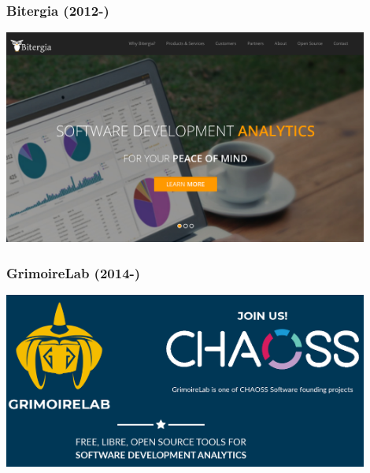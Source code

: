 \begin{frame}[fragile]
  \frametitle{Bitergia (2012-)}

  \begin{center}
  \includegraphics[width=12cm]{figs/bitergia}
  \end{center}  
  
\end{frame}

\begin{frame}[fragile]
  \frametitle{GrimoireLab (2014-)}

  \begin{center}
  \includegraphics[width=12cm]{figs/grimoirelab}
  \end{center}  
  
\end{frame}

